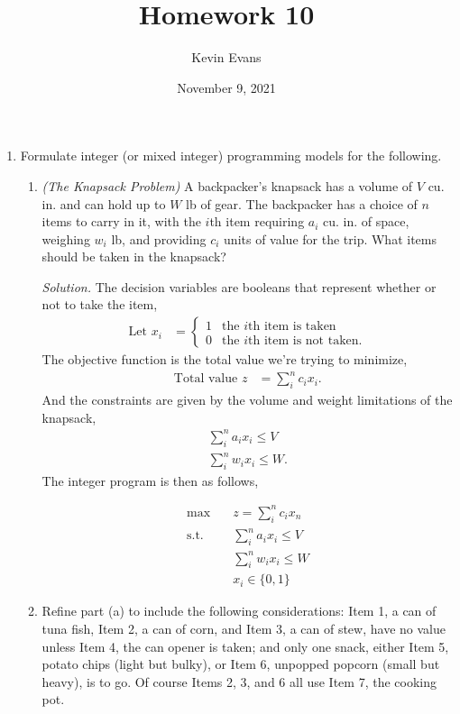 \documentclass{homework}
\title{Homework 10}
\author{Kevin Evans}
\date{November 9, 2021}
\newcommand{\st}{\mathrm{s.t.}}
\newcommand{\solution}{	\vspace{1em} \textit{Solution.} \quad }
\newcommand{\bolditem}[1][YYY]{\item[\textbf{#1}]}
\begin{document}
	\maketitle
	\begin{enumerate}
		\bolditem[6.2.8] Formulate integer (or mixed integer) programming models for the following. \begin{enumerate}
			\item \textit{(The Knapsack Problem)} A backpacker's knapsack has a volume of $V$ cu. in. and can hold up to $W$ lb of gear. The backpacker has a choice of $n$ items to carry in it, with the $i$th item requiring $a_i$ cu. in. of space, weighing $w_i$ lb, and providing $c_i$ units of value for the trip. What items should be taken in the knapsack?
			
			\solution The decision variables are booleans that represent whether or not to take the item, \begin{align*}
				\text{Let } x_i & = \begin{cases}
					1 & \text{the $i$th item is taken} \\
					0 & \text{the $i$th item is not taken}.
				\end{cases}
			\end{align*}
			The objective function is the total value we're trying to minimize, \begin{align*}
				\text{Total value } z & = \sum_i^n c_i x_i.
			\end{align*}
			And the constraints are given by the volume and weight limitations of the knapsack, \begin{align*}
				\sum_i^n a_i x_i \le V \\
				\sum_i^n w_i x_i \le W.
			\end{align*}
			The integer program is then as follows, \begin{tcolorbox}
				\vspace{-1em}
				\begin{align*}
					\max \quad & z = \sum_i^n c_i x_n \\
					\st \quad & \sum_i^n a_i x_i \le V \\
						& \sum_i^n w_i x_i \le W \\
						& x_i \in \{ 0, 1\}
				\end{align*}
			\end{tcolorbox}
		
			\pagebreak
			
			\item Refine part (a) to include the following considerations: Item 1, a can of tuna fish, Item 2, a can of corn, and Item 3, a can of stew, have no value unless Item 4, the can opener is taken; and only one snack, either Item 5, potato chips (light but bulky), or Item 6, unpopped popcorn (small but heavy), is to go. Of course Items 2, 3, and 6 all use Item 7, the cooking pot.
			

\end{enumerate}
\end{enumerate}
\end{document}
